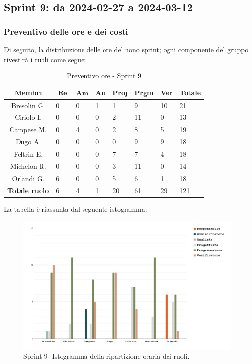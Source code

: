 \documentclass[10pt, a4paper]{article}
\begin{document}
\subsection{Sprint 9: da 2024-02-27 a 2024-03-12}

\subsubsection{Preventivo delle ore e dei costi}
Di seguito, la distribuzione delle ore del nono sprint; ogni componente del gruppo rivestirà i ruoli come segue:
\begin{table}[H]
\begin{tabularx}{\textwidth}{c|X|X|X|X|X|X|X}
    \textbf{Membri} & $\operatorname{\textbf{Re}}$ & $\mathrm{\textbf{Am}}$ & \textbf{An} & \textbf{Proj} & \textbf{Prgm} & \textbf{Ver} & \textbf{Totale} \\
        \hline Bresolin G. & 0 & 0 & 1 & 1 & 9 & \cellcolor{primarycolor}10 & 21 \\
        \hline Ciriolo I.  & 0 & 0 & 0 & 2 & \cellcolor{primarycolor}11 & 0 & 13 \\
        \hline Campese M.  & 0 & 4 & 0 & 2 & \cellcolor{primarycolor}8 & 5 & 19 \\
        \hline Dugo A.     & 0 & 0 & 0 & 0 & 9 & \cellcolor{primarycolor}9 & 18 \\
        \hline Feltrin E.  & 0 & 0 & 0 & \cellcolor{primarycolor}7 & 7 & 4 & 18 \\
        \hline Michelon R. & 0 & 0 & 0 & 3 & \cellcolor{primarycolor}11 & 0 & 14 \\
        \hline Orlandi G.  & \cellcolor{primarycolor}6 & 0 & 0 & 5 & 6 & 1 & 18 \\
        \hline
        \textbf{Totale ruolo} & 6 & 4 & 1 & 20 & 61 & 29 & 121 
    \end{tabularx}
    \caption{Preventivo ore - Sprint 9}
    \end{table}

La tabella è riassunta dal seguente istogramma:
 \begin{figure}[H]
        \centering        
        \includegraphics[width=15.5cm]{istogrammi/istogramma_9_periodo.png}
        \caption{Sprint 9- Istogramma della ripartizione oraria dei ruoli. }
    \end{figure}
\end{document}
